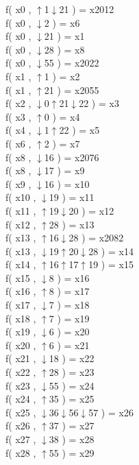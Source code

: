 f( x0 , $\uparrow$1$\downarrow$21 ) = x2012 \\
f( x0 , $\downarrow$2 ) = x6 \\
f( x0 , $\downarrow$21 ) = x1 \\
f( x0 , $\downarrow$28 ) = x8 \\
f( x0 , $\downarrow$55 ) = x2022 \\
f( x1 , $\uparrow$1 ) = x2 \\
f( x1 , $\uparrow$21 ) = x2055 \\
f( x2 , $\downarrow$0$\uparrow$21$\downarrow$22 ) = x3 \\
f( x3 , $\uparrow$0 ) = x4 \\
f( x4 , $\downarrow$1$\uparrow$22 ) = x5 \\
f( x6 , $\uparrow$2 ) = x7 \\
f( x8 , $\downarrow$16 ) = x2076 \\
f( x8 , $\downarrow$17 ) = x9 \\
f( x9 , $\downarrow$16 ) = x10 \\
f( x10 , $\downarrow$19 ) = x11 \\
f( x11 , $\uparrow$19$\downarrow$20 ) = x12 \\
f( x12 , $\uparrow$28 ) = x13 \\
f( x13 , $\uparrow$16$\downarrow$28 ) = x2082 \\
f( x13 , $\downarrow$19$\uparrow$20$\downarrow$28 ) = x14 \\
f( x14 , $\uparrow$16$\uparrow$17$\uparrow$19 ) = x15 \\
f( x15 , $\downarrow$8 ) = x16 \\
f( x16 , $\uparrow$8 ) = x17 \\
f( x17 , $\downarrow$7 ) = x18 \\
f( x18 , $\uparrow$7 ) = x19 \\
f( x19 , $\downarrow$6 ) = x20 \\
f( x20 , $\uparrow$6 ) = x21 \\
f( x21 , $\downarrow$18 ) = x22 \\
f( x22 , $\uparrow$28 ) = x23 \\
f( x23 , $\downarrow$55 ) = x24 \\
f( x24 , $\uparrow$35 ) = x25 \\
f( x25 , $\downarrow$36$\downarrow$56$\downarrow$57 ) = x26 \\
f( x26 , $\uparrow$37 ) = x27 \\
f( x27 , $\downarrow$38 ) = x28 \\
f( x28 , $\uparrow$55 ) = x29 \\
